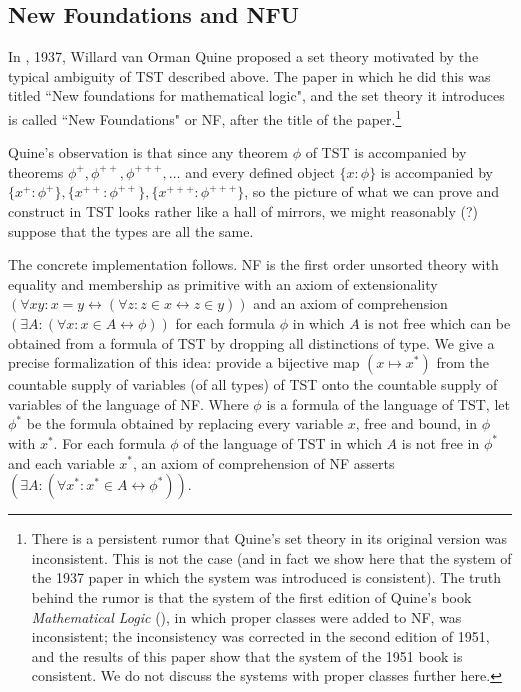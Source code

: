 \documentclass[112pt]{article}
\theoremstyle{definition}
\theoremstyle{remark}
\begin{document}
\subsection{New Foundations and NFU}

In \cite{nf}, 1937, Willard van Orman Quine proposed a set theory motivated by the typical ambiguity of TST described above.  The paper in which he did this was titled ``New foundations for mathematical logic", and the set theory it introduces is called ``New Foundations" or NF, after the title of the paper.\footnote{There is a persistent rumor that Quine's set theory in its original version was inconsistent.  This is not the case (and in fact we show here that the system of the 1937 paper in which the system was introduced is consistent).  The truth behind the rumor is that the system of the first edition of Quine's book {\em Mathematical Logic\/} (\cite{ml}), in which proper classes were added to NF, was inconsistent;  the inconsistency was corrected in the second edition of 1951, and the results of this paper show that the system of the 1951 book is consistent.  We do not discuss the systems with proper classes further here.}

Quine's observation is that since any theorem $\phi$ of TST is accompanied by theorems $\phi^+, \phi^{++}, \phi^{+++}, \ldots$ and every defined object $\{x:\phi\}$ is accompanied by
$\{x^+:\phi^+\},\{x^{++}:\phi^{++}\},\{x^{+++}:\phi^{+++}\}$, so the picture of what we can prove and construct in TST looks rather like a hall of mirrors, we might reasonably (?) suppose that the types are all the same.

The concrete implementation follows.  NF is the first order unsorted theory with equality and membership as primitive with an axiom of extensionality $(\forall xy:x=y \leftrightarrow (\forall z:z \in x \leftrightarrow z\in y))$ and an axiom of comprehension $(\exists A:(\forall x:x \in A \leftrightarrow \phi))$ for each formula $\phi$ in which $A$ is not free which can be obtained from a formula of TST by dropping all distinctions of type.  We give a precise formalization of this idea:  provide a bijective map $(x \mapsto x^*)$ from the countable supply of variables (of all types) of TST onto the countable supply of variables of the language of NF.  Where $\phi$ is a formula of the language of TST, let $\phi^*$ be the formula obtained by replacing every variable $x$, free and bound,
in $\phi$ with $x^*$. For each formula $\phi$ of the language of TST in which $A$ is not free in $\phi^*$ and each variable $x^*$, an axiom of comprehension of NF asserts $(\exists A:(\forall x^*:x^* \in A \leftrightarrow \phi^*))$.
\end{document}
